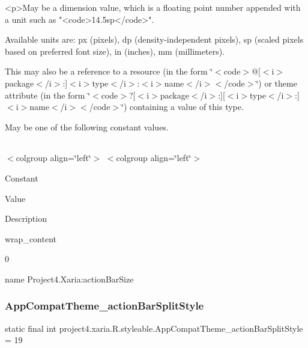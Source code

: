\begin{DoxyVerb}      <p>May be a dimension value, which is a floating point number appended with a unit such as "<code>14.5sp</code>".
\end{DoxyVerb}
 Available units are\+: px (pixels), dp (density-\/independent pixels), sp (scaled pixels based on preferred font size), in (inches), mm (millimeters). 

This may also be a reference to a resource (in the form \char`\"{}$<$code$>$@\mbox{[}$<$i$>$package$<$/i$>$\+:\mbox{]}$<$i$>$type$<$/i$>$\+:$<$i$>$name$<$/i$>$$<$/code$>$\char`\"{}) or theme attribute (in the form \char`\"{}$<$code$>$?\mbox{[}$<$i$>$package$<$/i$>$\+:\mbox{]}\mbox{[}$<$i$>$type$<$/i$>$\+:\mbox{]}$<$i$>$name$<$/i$>$$<$/code$>$\char`\"{}) containing a value of this type. 

May be one of the following constant values.

\tabulinesep=1mm
\begin{longtabu} spread 0pt [c]{*{0}{|X[-1]}|}
\hline
\end{longtabu}
$<$colgroup align=\char`\"{}left\char`\"{}$>$ $<$colgroup align=\char`\"{}left\char`\"{}$>$ 

Constant

Value

Description 

{\ttfamily wrap\+\_\+content}

0

name Project4.\+Xaria\+:action\+Bar\+Size \mbox{\label{classproject4_1_1xaria_1_1R_1_1styleable_ac50c18be5c3e3ba9e240f8f463553bb8}} 
\subsubsection{\texorpdfstring{App\+Compat\+Theme\+\_\+action\+Bar\+Split\+Style}{AppCompatTheme\_actionBarSplitStyle}}
{\footnotesize\ttfamily static final int project4.\+xaria.\+R.\+styleable.\+App\+Compat\+Theme\+\_\+action\+Bar\+Split\+Style = 19\hspace{0.3cm}{\ttfamily [static]}}

